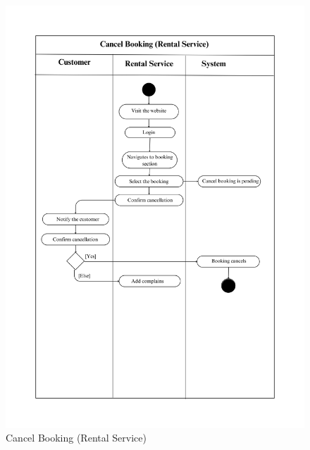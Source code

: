 \begin{figure}[h]
    \centering
    \includegraphics[width=1\textwidth]{Images/Activity Diagrams/25 Cancel Booking (Rental Service).png}
    \caption{Cancel Booking (Rental Service)}
    \label{fig:activity-cancel-rental}
\end{figure}

